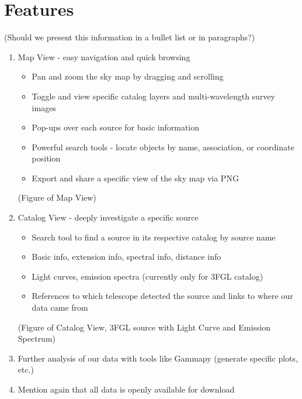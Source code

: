 \section{Features}

(Should we present this information in a bullet list or in paragraphs?)

\begin{enumerate}

\item Map View - easy navigation and quick browsing

  \begin{itemize}

  \item Pan and zoom the sky map by dragging and scrolling

  \item Toggle and view specific catalog layers and multi-wavelength survey images

  \item Pop-ups over each source for basic information

  \item Powerful search tools - locate objects by name, association, or coordinate position

  \item Export and share a specific view of the sky map via PNG

  \end{itemize}

  (Figure of Map View)


\item Catalog View - deeply investigate a specific source

  \begin{itemize}

  \item Search tool to find a source in its respective catalog by source name

  \item Basic info, extension info, spectral info, distance info

  \item Light curves, emission spectra (currently only for 3FGL catalog)

  \item References to which telescope detected the source and links to where our data came from

  \end{itemize}

  (Figure of Catalog View, 3FGL source with Light Curve and Emission Spectrum)


\item Further analysis of our data with tools like Gammapy (generate specific plots, etc.)

\item Mention again that all data is openly available for download

\end{enumerate}
